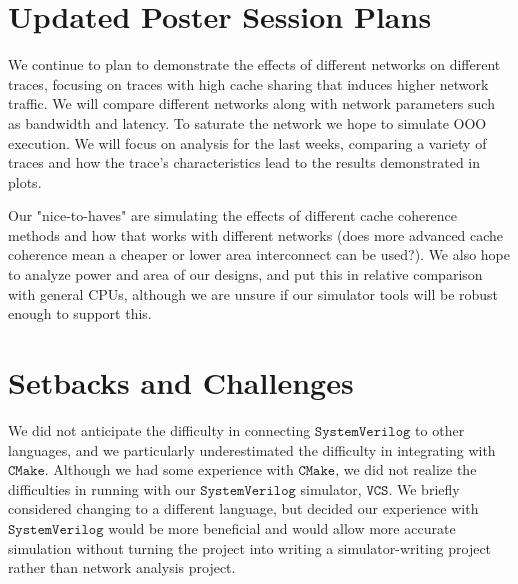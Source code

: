 \documentclass{article}
\begin{document}
\section{Updated Poster Session Plans}
We continue to plan to demonstrate the effects of different networks on different traces, focusing on traces with high cache sharing that induces higher network traffic. We will compare different networks along with network parameters such as bandwidth and latency. To saturate the network we hope to simulate OOO execution. We will focus on analysis for the last weeks, comparing a variety of traces and how the trace's characteristics lead to the results demonstrated in plots. 

Our "nice-to-haves" are simulating the effects of different cache coherence methods and how that works with different networks (does more advanced cache coherence mean a cheaper or lower area interconnect can be used?). We also hope to analyze power and area of our designs, and put this in relative comparison with general CPUs, although we are unsure if our simulator tools will be robust enough to support this. 
    
\section{Setbacks and Challenges}
We did not anticipate the difficulty in connecting $\texttt{SystemVerilog}$ to other languages, and we particularly underestimated the difficulty in integrating with $\texttt{CMake}$. Although we had some experience with $\texttt{CMake}$, we did not realize the difficulties in running with our $\texttt{SystemVerilog}$ simulator, $\texttt{VCS}$. We briefly considered changing to a different language, but decided our experience with $\texttt{SystemVerilog}$ would be more beneficial and would allow more accurate simulation without turning the project into writing a simulator-writing project rather than network analysis project. 
\end{document}
